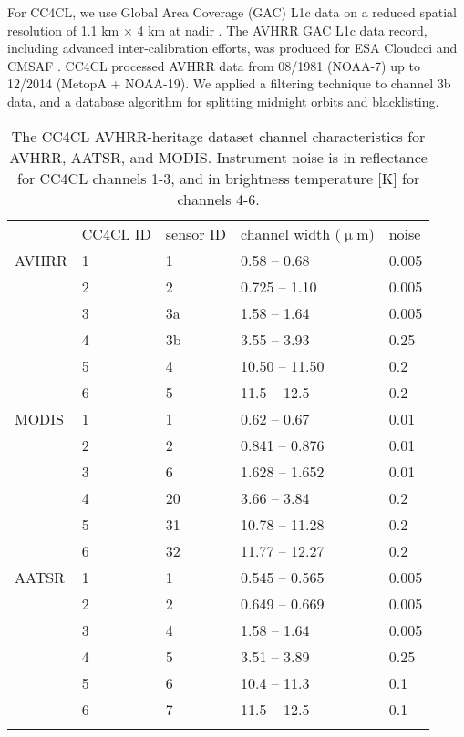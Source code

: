 For CC4CL, we use Global Area Coverage (GAC) L1c data on a reduced spatial resolution of 1.1 km $\times$ 4 km at nadir \citep{Devasthale16}. The AVHRR GAC L1c data record, including advanced inter-calibration efforts, was produced for ESA Cloud\textunderscore cci and CMSAF \citep{Schulz09,Karlsson13}. CC4CL processed AVHRR data from 08/1981 (NOAA-7) up to 12/2014 (MetopA + NOAA-19). We applied a filtering technique to channel 3b data, and a database algorithm for splitting midnight orbits and blacklisting. 

\begin{table}[h]
  \caption{The CC4CL AVHRR-heritage dataset channel characteristics for AVHRR, AATSR, and MODIS. Instrument noise is in reflectance for CC4CL channels 1-3, and in brightness temperature [K] for channels 4-6.}
  \begin{tabular}{l|p{0.7cm}p{0.7cm}p{1.8cm}p{0.5cm}}
    \tophline
    & CC4CL ID & sensor ID & channel width ($\upmu$m) & noise \\
    \middlehline
    AVHRR & 1 & 1 & 0.58 -- 0.68 & 0.005 \\
          & 2 & 2 & 0.725 -- 1.10 & 0.005 \\
          & 3 & 3a & 1.58 -- 1.64 & 0.005 \\
          & 4 & 3b & 3.55 -- 3.93 & 0.25 \\
          & 5 & 4 & 10.50 -- 11.50 & 0.2 \\
          & 6 & 5 & 11.5 -- 12.5 & 0.2 \\
    \middlehline
    MODIS & 1 & 1 & 0.62 -- 0.67 & 0.01 \\
          & 2 & 2 & 0.841 -- 0.876 & 0.01 \\
          & 3 & 6 & 1.628 -- 1.652 & 0.01 \\
          & 4 & 20 & 3.66 -- 3.84 & 0.2 \\
          & 5 & 31 & 10.78 -- 11.28 & 0.2 \\
          & 6 & 32 & 11.77 -- 12.27 & 0.2 \\
    \middlehline
    AATSR & 1 & 1 & 0.545 -- 0.565 & 0.005 \\
          & 2 & 2 & 0.649 -- 0.669 & 0.005 \\
          & 3 & 4 & 1.58 -- 1.64 & 0.005 \\
          & 4 & 5 & 3.51 -- 3.89 & 0.25 \\
          & 5 & 6 & 10.4 -- 11.3 & 0.1 \\
          & 6 & 7 & 11.5 -- 12.5 & 0.1 \\
    \bottomhline
  \end{tabular}
  \label{tab:channels}
\end{table}

